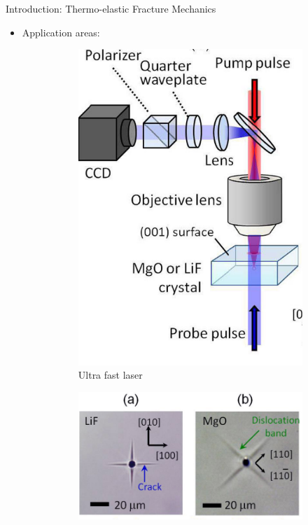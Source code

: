 \documentclass{beamer}
\begin{document}
\begin{frame}[t,fragile]{Introduction: Thermo-elastic Fracture Mechanics}
\begin{itemize}
         \item Application areas:
       \vspace{-.1cm}
\begin{figure}[H]
      \begin{subfigure}{0.45\textwidth}
    \centering
    \includegraphics[scale=.1]{m}
 \vspace{-.2cm}
 \caption{\tiny Ultra fast laser}
 \end{subfigure}
\begin{subfigure}{0.45\textwidth}
    \centering
    \includegraphics[scale=.1]{l}

\end{subfigure}
\end{figure}
\end{itemize}
\end{frame}
\end{document}

